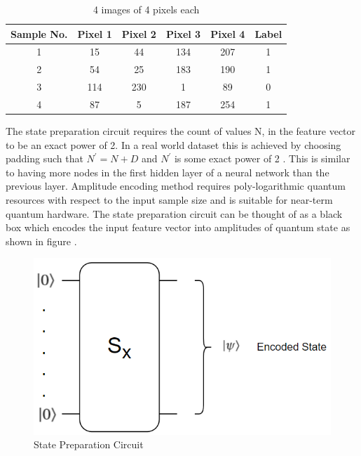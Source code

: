 \documentclass[english,a4paper,11pt,oneside,onecolumn]{book}
\begin{document}
\begin{table}[H]
\begin{center}
\begin{tabular}{|c|c|c|c|c|c|}
\hline
\textbf{Sample No.} & \textbf{Pixel 1} & \textbf{Pixel 2} & \textbf{Pixel 3} & \textbf{Pixel 4} & \textbf{Label} \\
\hline
1 & 15 & 44 & 134 & 207 & 1\\
\hline
2 & 54 & 25 & 183 & 190 & 1\\
\hline
3 & 114 & 230 & 1 & 89 & 0\\
\hline
4 & 87 & 5 & 187 & 254 & 1\\
\hline
\end{tabular}
\end{center}
\caption{4 images of 4 pixels each} 
\label{tab:sampleImages}
\end{table}

The state preparation circuit requires the count of values N, in the feature vector to be an exact power of 2. In a real world dataset this is achieved by choosing padding such that \(N^{'} = N + D\) and \(N^{'}\) is some exact power of 2 \cite{schuld_2020_circuitcentric}. This is similar to having more nodes in the first hidden layer of a neural network than the previous layer. Amplitude encoding method requires poly-logarithmic quantum resources with respect to the input sample size and is suitable for near-term quantum hardware. The state preparation circuit can be thought of as a black box which encodes the input feature vector into amplitudes of quantum state as shown in figure .

\begin{figure}[H]
    \centering
    \includegraphics[scale=0.6]{Images/StatePreparationCircuit.PNG}
    \caption{State Preparation Circuit}
    \label{fig:statePrepCirc}
\end{figure}
\end{document}
